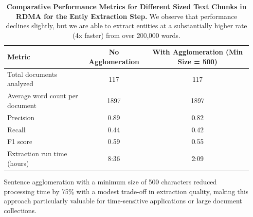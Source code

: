 \begin{table}[h]
\centering

\begin{tabular}{l|c|c}
\hline
\textbf{Metric} & \textbf{No Agglomeration} & \textbf{With Agglomeration (Min Size = 500)} \\
\hline
Total documents analyzed & 117 & 117 \\
Average word count per document & 1897 & 1897 \\
Precision & 0.89 & 0.82 \\
Recall & 0.44 & 0.42 \\
F1 score & 0.59 & 0.55 \\
Extraction run time (hours) & 8:36 & 2:09 \\
\hline
\end{tabular}
\caption{\textbf{Comparative Performance Metrics for Different Sized Text Chunks in RDMA for the Entiy Extraction Step.}  We observe that performance declines slightly, but we are able to extract entities at a substantially higher rate (4x faster) from over 200,000 words.}
\label{tab:agglomeration_tradeoff}
\end{table}

Sentence agglomeration with a minimum size of 500 characters reduced processing time by 75\% with a modest trade-off in extraction quality, making this approach particularly valuable for time-sensitive applications or large document collections.
\clearpage